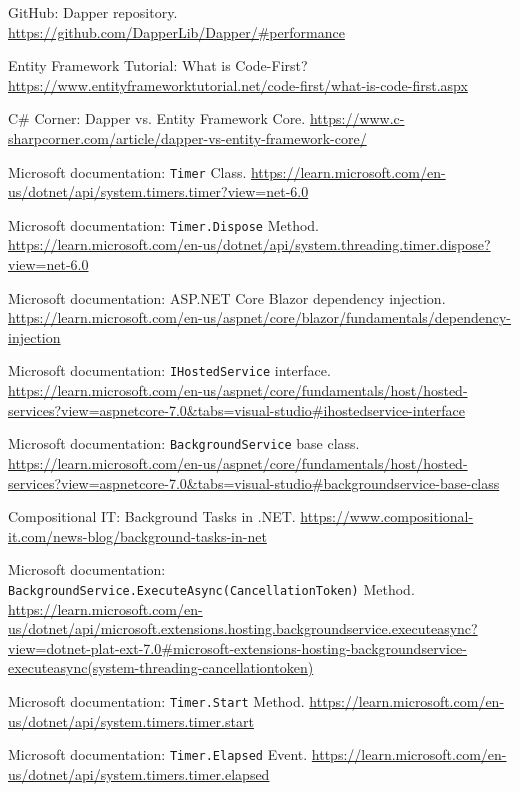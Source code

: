 \begin{thebibliography}{99}
GitHub: Dapper repository.
\url{https://github.com/DapperLib/Dapper/#performance}

Entity Framework Tutorial: What is Code-First?
\url{https://www.entityframeworktutorial.net/code-first/what-is-code-first.aspx}

C\# Corner: Dapper vs. Entity Framework Core.
\url{https://www.c-sharpcorner.com/article/dapper-vs-entity-framework-core/}

Microsoft documentation: \verb|Timer| Class.
\url{https://learn.microsoft.com/en-us/dotnet/api/system.timers.timer?view=net-6.0}

Microsoft documentation: \verb|Timer.Dispose| Method.
\url{https://learn.microsoft.com/en-us/dotnet/api/system.threading.timer.dispose?view=net-6.0}

Microsoft documentation: ASP.NET Core Blazor dependency injection.
\url{https://learn.microsoft.com/en-us/aspnet/core/blazor/fundamentals/dependency-injection}

Microsoft documentation: \verb|IHostedService| interface.
\url{https://learn.microsoft.com/en-us/aspnet/core/fundamentals/host/hosted-services?view=aspnetcore-7.0&tabs=visual-studio\#ihostedservice-interface}

Microsoft documentation: \verb|BackgroundService| base class.
\url{https://learn.microsoft.com/en-us/aspnet/core/fundamentals/host/hosted-services?view=aspnetcore-7.0&tabs=visual-studio\#backgroundservice-base-class}

Compositional IT: Background Tasks in .NET.
\url{https://www.compositional-it.com/news-blog/background-tasks-in-net}

Microsoft documentation: \verb|BackgroundService.ExecuteAsync(CancellationToken)| Method.
\url{https://learn.microsoft.com/en-us/dotnet/api/microsoft.extensions.hosting.backgroundservice.executeasync?view=dotnet-plat-ext-7.0\#microsoft-extensions-hosting-backgroundservice-executeasync(system-threading-cancellationtoken)}

Microsoft documentation: \verb|Timer.Start| Method.
\url{https://learn.microsoft.com/en-us/dotnet/api/system.timers.timer.start}

Microsoft documentation: \verb|Timer.Elapsed| Event.
\url{https://learn.microsoft.com/en-us/dotnet/api/system.timers.timer.elapsed}


\end{thebibliography}
